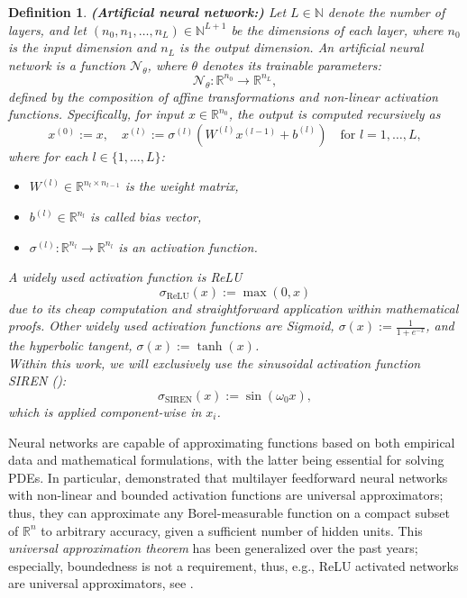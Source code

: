 \documentclass[12pt,openany]{book}
\newcommand{\R}{\mathbb{R}}
\theoremstyle{plainnormal}
\newtheorem{definition}[theorem]{Definition}
\theoremstyle{remark}
\begin{document}
\begin{definition}\textbf{(Artificial neural network:)}
   Let \( L \in \mathbb{N} \) denote the number of layers, and let \( (n_0, n_1, \dots, n_L) \in \mathbb{N}^{L+1} \) be the dimensions of each layer, where \( n_0 \) is the input dimension and \( n_L \) is the output dimension. An \textit{artificial neural network} is a function $\mathcal{N}_\theta$, where $\theta$ denotes its trainable parameters:
\[
\mathcal{N}_\theta: \mathbb{R}^{n_0} \rightarrow \mathbb{R}^{n_L},
\]
defined by the composition of affine transformations and non-linear activation functions. Specifically, for input \( x \in \mathbb{R}^{n_0} \), the output is computed recursively as
\[
x^{(0)} := x, \quad x^{(l)} := \sigma^{(l)}(W^{(l)} x^{(l-1)} + b^{(l)}) \quad \text{for } l = 1, \dots, L,
\]
where for each \( l \in \{1, \dots, L\} \):
\begin{itemize}
    \item \( W^{(l)} \in \mathbb{R}^{n_l \times n_{l-1}} \) is the weight matrix,
    \item \( b^{(l)} \in \mathbb{R}^{n_l} \) is called bias vector,
    \item \( \sigma^{(l)}: \mathbb{R}^{n_l} \rightarrow \mathbb{R}^{n_l} \) is an activation function.
\end{itemize}
A widely used activation function is ReLU $$\sigma_{\text{ReLU}}(x) := \max(0, x)$$
due to its cheap computation and straightforward application within mathematical proofs. Other widely used activation functions are Sigmoid, $\sigma(x) := \frac{1}{1+e^{-x}} $, and the hyperbolic tangent, $\sigma(x) :=\tanh(x)$.\\
Within this work, we will exclusively use the sinusoidal activation function SIREN (\cite{sitzmann2020implicitneuralrepresentationsperiodic}): $$\sigma_{\text{SIREN}}(x) := \sin(\omega_0 x),$$
which is applied component-wise in $x_i$.
\end{definition}
Neural networks are capable of approximating functions based on both empirical data and mathematical formulations, with the latter being essential for solving PDEs. In particular, \cite{HORNIK1989359} demonstrated that multilayer feedforward neural networks with non-linear and bounded activation functions are universal approximators; thus, they can approximate any Borel-measurable function on a compact subset of $\R^n$ to arbitrary accuracy, given a sufficient number of hidden units. This \emph{universal approximation theorem} has been generalized over the past years; especially, boundedness is not a requirement, thus, e.g., ReLU activated networks are universal approximators, see \cite{petersen2018optimalapproximationpiecewisesmooth}. \\
\end{document}
